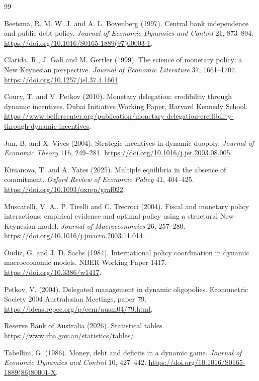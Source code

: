 \documentclass[11pt]{article}
\begin{document}
\begin{thebibliography}{99}

Beetsma, R. M. W. J. and A. L. Bovenberg (1997).
Central bank independence and public debt policy.
\emph{Journal of Economic Dynamics and Control} 21, 873--894.
\url{https://doi.org/10.1016/S0165-1889(97)00003-1}.

Clarida, R., J. Gal\'i and M. Gertler (1999).
The science of monetary policy: a New Keynesian perspective.
\emph{Journal of Economic Literature} 37, 1661--1707.
\url{https://doi.org/10.1257/jel.37.4.1661}.

Coury, T. and V. Petkov (2010).
Monetary delegation: credibility through dynamic incentives.
Dubai Initiative Working Paper, Harvard Kennedy School.
\url{https://www.belfercenter.org/publication/monetary-delegation-credibility-through-dynamic-incentives}.

Jun, B. and X. Vives (2004).
Strategic incentives in dynamic duopoly.
\emph{Journal of Economic Theory} 116, 249--281.
\url{https://doi.org/10.1016/j.jet.2003.08.005}.

Kirsanova, T. and A. Yates (2025).
Multiple equilibria in the absence of commitment.
\emph{Oxford Review of Economic Policy} 41, 404--425.
\url{https://doi.org/10.1093/oxrep/graf022}.

Muscatelli, V. A., P. Tirelli and C. Trecroci (2004).
Fiscal and monetary policy interactions: empirical evidence and optimal policy
using a structural New-Keynesian model.
\emph{Journal of Macroeconomics} 26, 257--280.
\url{https://doi.org/10.1016/j.jmacro.2003.11.014}.

Oudiz, G. and J. D. Sachs (1984).
International policy coordination in dynamic macroeconomic models.
NBER Working Paper 1417.
\url{https://doi.org/10.3386/w1417}.

Petkov, V. (2004).
Delegated management in dynamic oligopolies.
Econometric Society 2004 Australasian Meetings, paper 79.
\url{https://ideas.repec.org/p/ecm/ausm04/79.html}.

Reserve Bank of Australia (2026).
Statistical tables.
\url{https://www.rba.gov.au/statistics/tables/}.

Tabellini, G. (1986).
Money, debt and deficits in a dynamic game.
\emph{Journal of Economic Dynamics and Control} 10, 427--442.
\url{https://doi.org/10.1016/S0165-1889(86)80001-X}.

\end{thebibliography}
\end{document}
